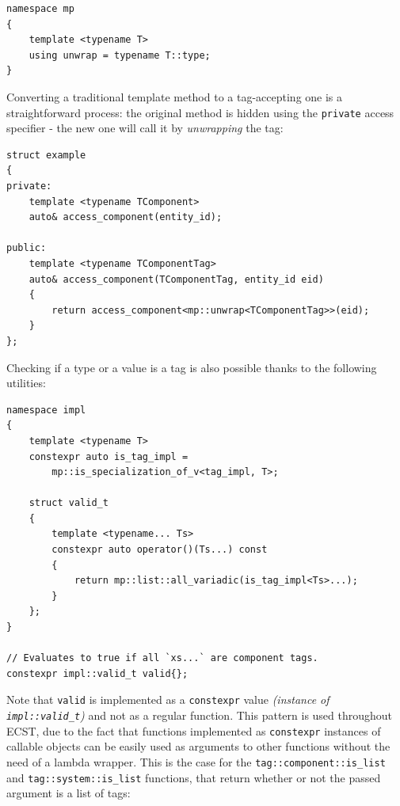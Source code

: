 \documentclass[twoside, 12pt, a4paper, openright]{book}
\begin{document}
\begin{verbatim}
namespace mp
{
    template <typename T>
    using unwrap = typename T::type;
}
\end{verbatim}

Converting a traditional template method to a tag-accepting one is a
straightforward process: the original method is hidden using the
\texttt{private}
access specifier - the new one will call it by \emph{unwrapping} the
tag:

\begin{verbatim}
struct example
{
private:
    template <typename TComponent>
    auto& access_component(entity_id);

public:
    template <typename TComponentTag>
    auto& access_component(TComponentTag, entity_id eid)
    {
        return access_component<mp::unwrap<TComponentTag>>(eid);
    }
};
\end{verbatim}

Checking if a type or a value is a tag is also possible thanks to the
following utilities:

\begin{verbatim}
namespace impl
{
    template <typename T>
    constexpr auto is_tag_impl =
        mp::is_specialization_of_v<tag_impl, T>;

    struct valid_t
    {
        template <typename... Ts>
        constexpr auto operator()(Ts...) const
        {
            return mp::list::all_variadic(is_tag_impl<Ts>...);
        }
    };
}

// Evaluates to true if all `xs...` are component tags.
constexpr impl::valid_t valid{};
\end{verbatim}

Note that
\texttt{valid}
is implemented as a
\texttt{constexpr}
value \emph{(instance of
\texttt{impl::valid_t})}
and not as a regular function. This pattern is used throughout ECST, due
to the fact that functions implemented as
\texttt{constexpr}
instances of callable objects can be easily used as arguments to other
functions without the need of a lambda wrapper. This is the case for the
\texttt{tag::component::is_list}
and
\texttt{tag::system::is_list}
functions, that return whether or not the passed argument is a list of
tags:
\end{document}

